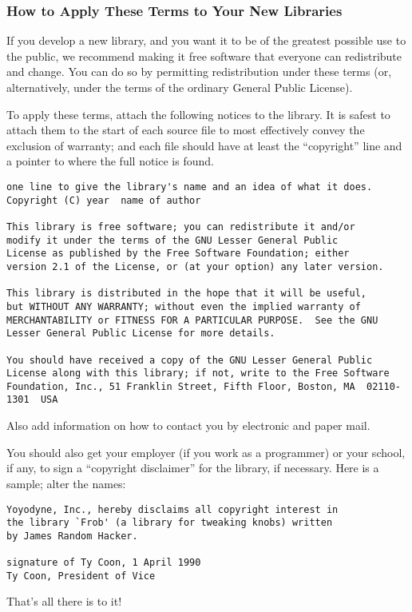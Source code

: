 \documentclass[]{article}
\begin{document}
\subsubsection{How to Apply These Terms to Your New Libraries}

If you develop a new library, and you want it to be of the greatest
possible use to the public, we recommend making it free software that
everyone can redistribute and change. You can do so by permitting
redistribution under these terms (or, alternatively, under the terms of
the ordinary General Public License).

To apply these terms, attach the following notices to the library. It is
safest to attach them to the start of each source file to most
effectively convey the exclusion of warranty; and each file should have
at least the ``copyright'' line and a pointer to where the full notice
is found.

\begin{verbatim}
one line to give the library's name and an idea of what it does.
Copyright (C) year  name of author

This library is free software; you can redistribute it and/or
modify it under the terms of the GNU Lesser General Public
License as published by the Free Software Foundation; either
version 2.1 of the License, or (at your option) any later version.

This library is distributed in the hope that it will be useful,
but WITHOUT ANY WARRANTY; without even the implied warranty of
MERCHANTABILITY or FITNESS FOR A PARTICULAR PURPOSE.  See the GNU
Lesser General Public License for more details.

You should have received a copy of the GNU Lesser General Public
License along with this library; if not, write to the Free Software
Foundation, Inc., 51 Franklin Street, Fifth Floor, Boston, MA  02110-1301  USA
\end{verbatim}

Also add information on how to contact you by electronic and paper mail.

You should also get your employer (if you work as a programmer) or your
school, if any, to sign a ``copyright disclaimer'' for the library, if
necessary. Here is a sample; alter the names:

\begin{verbatim}
Yoyodyne, Inc., hereby disclaims all copyright interest in
the library `Frob' (a library for tweaking knobs) written
by James Random Hacker.

signature of Ty Coon, 1 April 1990
Ty Coon, President of Vice
\end{verbatim}

That's all there is to it!
\end{document}
